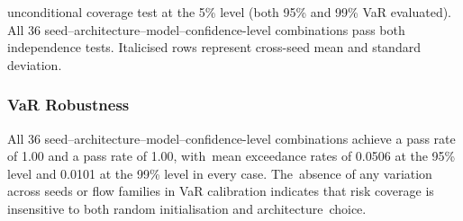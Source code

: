 \documentclass[risks,article,accept,pdftex,moreauthors]{Definitions/mdpi}
\begin{document}
\begin{table}[H]
{{%
 unconditional coverage test at the 5\% level (both 95\% and 99\% VaR evaluated). All 36 seed--architecture--model--confidence-level combinations pass both \citep{kupiec1995techniques, christoffersen1998evaluating} %
 independence tests. Italicised rows represent cross-seed mean and standard deviation.}}
\end{table}

\subsubsection{VaR Robustness}
All 36 seed--architecture--model--confidence-level combinations achieve a \citep{kupiec1995techniques} %
 pass rate of 1.00 and a \citep{christoffersen1998evaluating} %
 pass rate of 1.00, with~mean exceedance rates of 0.0506 at the 95\% level and 0.0101 at the 99\% level in every case. The~absence of any variation across seeds or flow families in VaR calibration indicates that risk coverage is insensitive to both random initialisation and architecture~choice.
\end{document}
